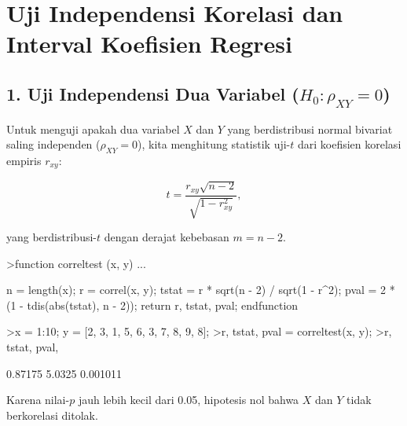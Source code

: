 \documentclass[a4paper,11pt,oneside,enabledeprecatedfontcommands]{scrbook}
\newenvironment{eulernotebook}{}{}
\newcommand{\eulerheading}[1]{\chapter{#1}}
\newcommand{\eulersubheading}[1]{\section{#1}}
\newenvironment{eulercomment}{\par\medskip\noindent}{\par\medskip}
\newenvironment{eulerformula}{}{}
\begin{document}
\begin{eulernotebook}
		\eulerheading{Uji Independensi Korelasi dan Interval Koefisien Regresi}
		\eulersubheading{1. Uji Independensi Dua Variabel ($H_0: \rho_{XY} = 0$)}
		\begin{eulercomment}
			Untuk menguji apakah dua variabel $X$ dan $Y$ yang berdistribusi normal bivariat saling independen
			($\rho_{XY} = 0$), kita menghitung statistik uji-$t$ dari koefisien korelasi empiris $r_{xy}$:
		\end{eulercomment}
		\begin{eulerformula}
			\[
			t = \frac{r_{xy}\sqrt{n-2}}{\sqrt{1 - r_{xy}^2}},
			\]
		\end{eulerformula}
		\begin{eulercomment}
			yang berdistribusi-$t$ dengan derajat kebebasan $m = n - 2$.
		\end{eulercomment}
		\begin{eulerprompt}
			>function correltest (x, y) ...
		\end{eulerprompt}
		\begin{eulerudf}
			n = length(x);
			r = correl(x, y);
			tstat = r * sqrt(n - 2) / sqrt(1 - r^2);
			pval = 2 * (1 - tdis(abs(tstat), n - 2));
			return {r, tstat, pval};
			endfunction
		\end{eulerudf}
		\begin{eulerprompt}
			>x = 1:10; y = [2, 3, 1, 5, 6, 3, 7, 8, 9, 8];
			>{r, tstat, pval} = correltest(x, y);
			>r, tstat, pval,
		\end{eulerprompt}
		\begin{euleroutput}
			0.87175
			5.0325
			0.001011
		\end{euleroutput}
		\begin{eulercomment}
			Karena nilai-$p$ jauh lebih kecil dari 0.05, hipotesis nol bahwa $X$ dan $Y$ tidak berkorelasi ditolak.
		\end{eulercomment}
		

\end{eulernotebook}
\end{document}
